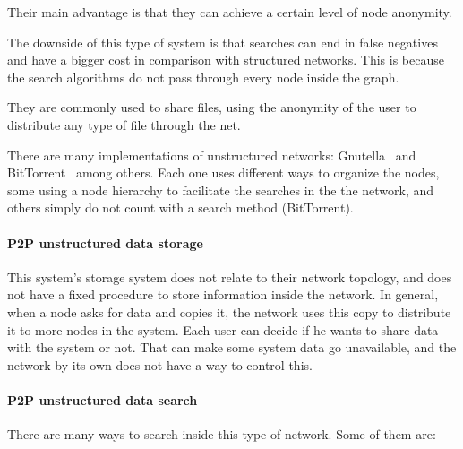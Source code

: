 Their main advantage is that they can achieve a certain level of node anonymity.

The downside of this type of system is that searches can end in false
negatives and have a bigger cost in comparison with structured networks. This
is because the search algorithms do not pass through every node inside the
graph.

They are commonly used to share files, using the anonymity of the user to
distribute any type of file through the net.

There are many implementations of unstructured networks:
Gnutella~\cite{oai:CiteSeerXPSU:10.1.1.61.7302} and
BitTorrent~\cite{bittorrent}
among others. Each one uses different ways to organize the nodes, some using a
node hierarchy to facilitate the searches in the the network, and others simply
do not count with a search method (BitTorrent).

\paragraph{P2P unstructured data storage}
\label{sec:p2p_unstructured_storage}

This system's storage system does not relate to their network topology, and
does not have a fixed procedure to store information inside the network. In
general, when a node asks for data
and copies it, the network uses this copy to distribute it to more nodes in the
system. Each user can decide if he wants to share data with the system or not.
That can make some system data go unavailable, and the network by its
own does not have a way to control this.


\paragraph{P2P unstructured data search}
\label{sec:p2p_unstructured_search}

There are many ways to search inside this type of network. Some of them
are:

